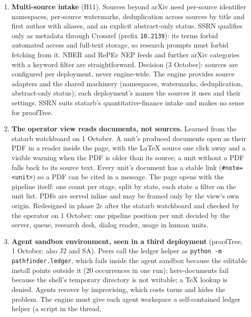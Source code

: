 \documentclass[11pt,a4paper]{article}
\begin{document}
\begin{enumerate}[label=\textbf{S\arabic*}]
  on 30 September stalled Hyperliquid collection and Polymarket quotes at once;
  both recovered unnoticed. Each feed needs a staleness threshold that raises an
  event (D1) rather than a line in a log.
\item \textbf{Multi-source intake} (H11). Sources beyond arXiv need per-source
  identifier namespaces, per-source watermarks, deduplication across sources by
  title and first author with aliases, and an explicit abstract-only status. SSRN
  qualifies only as metadata through Crossref (prefix \texttt{10.2139}): its terms
  forbid automated access and full-text storage, so research prompts must forbid
  fetching from it. NBER and RePEc NEP feeds and further arXiv categories with a
  keyword filter are straightforward.
  Decision (3 October): sources are configured per deployment, never engine-wide.
  The engine provides source adapters and the shared machinery (namespaces,
  watermarks, deduplication, abstract-only status); each deployment's
   names the sources it uses and their settings. SSRN suits
  statarb's quantitative-finance intake and makes no sense for proofTree.
\item \textbf{The operator view reads documents, not sources.} Learned from the
  statarb watchboard on 1 October. A unit's produced documents open as their
  PDF in a reader inside the page, with the \LaTeX{} source one click away and a
  visible warning when the PDF is older than its source; a unit without a PDF
  falls back to its source text. Every unit's document has a stable link
  (\texttt{\#note=<unit>}) so a PDF can be cited in a message. The page opens
  with the pipeline itself: one count per stage, split by state, each state a
  filter on the unit list. PDFs are served inline and may be framed only by the
  view's own origin.
  Redesigned in phase 2c after the statarb watchboard and checked by the operator on 1 October: one pipeline position per unit decided by the server, queue, research desk, dialog reader, usage in human units.
\item \textbf{Agent sandbox environment, seen in a third deployment} (proofTree,
  1 October; also J2 and SA). Peers call the ledger helper as \texttt{python -m
  pathfinder.ledger}, which fails inside the agent sandbox because the editable
  install points outside it (20 occurrences in one run); here-documents fail because
  the shell's temporary directory is not writable; a TeX lookup is denied. Agents
  recover by improvising, which costs turns and hides the problem. The engine must
  give each agent workspace a self-contained ledger helper (a script in the thread,

\end{enumerate}
\end{document}
